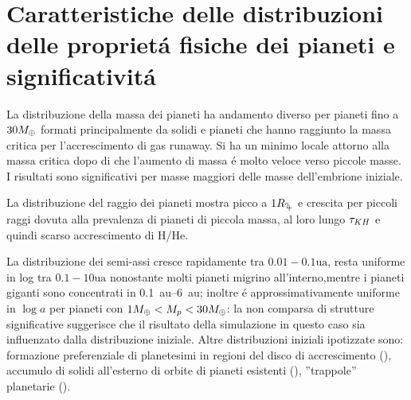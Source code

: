 \clearpage

\section{Caratteristiche delle distribuzioni delle propriet\'a fisiche dei pianeti e significativit\'a}


La distribuzione della massa dei pianeti ha andamento diverso per pianeti fino a $30M_{\oplus}{}$ formati principalmente da solidi e pianeti che hanno raggiunto la massa critica per l'accrescimento di gas runaway.
Si ha un minimo locale attorno alla massa critica dopo di che l'aumento di massa \'e molto veloce verso piccole masse. I risultati sono significativi per masse maggiori delle masse dell'embrione iniziale.

La distribuzione del raggio dei pianeti mostra picco a $1\rjupiter$ e crescita per piccoli raggi dovuta alla prevalenza di pianeti di piccola massa, al loro lungo $\tau_{KH}{}$ e quindi scarso accrescimento di H/He.

La distribuzione dei semi-assi cresce rapidamente tra $0.01-0.1\si{\astronomicalunit}$, resta uniforme in log tra $0.1-10\si{\astronomicalunit}$ nonostante molti pianeti migrino all'interno,mentre i pianeti giganti sono concentrati in \SIrange{0.1}{6}{\astronomicalunit}; inoltre \'e approssimativamente uniforme in $\log{a}$ per pianeti con $1M_{\oplus}{}<M_p<30M_{\oplus}{}$: la non comparsa di strutture significative suggerisce che il risultato della simulazione in questo caso sia influenzato dalla distribuzione iniziale. Altre distribuzioni iniziali ipotizzate sono: formazione preferenziale di planetesimi in regioni del disco di accrescimento (\cite{drkazkowska2016close}), accumulo di solidi all'esterno di orbite di pianeti esistenti (\cite{pinilla2015sequential}), ''trappole'' planetarie (\cite{hasegawa2012evolutionary}).


